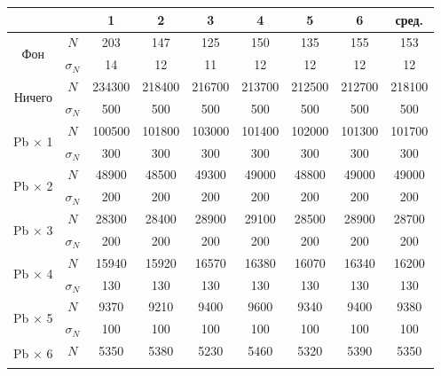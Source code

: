 \documentclass[a4paper,12pt]{article}
\begin{document}
\begin{table}[h!]
\begin{tabular}{|c|c|c|c|c|c|c|c|c|}
\hline
\multicolumn{2}{|c|}{}                      & 1      & 2      & 3      & 4      & 5      & 6      & сред.  \\ \hline
\multirow{2}{*}{Фон}           & $N$        & 203    & 147    & 125    & 150    & 135    & 155    & 153    \\ \cline{2-9} 
                               & $\sigma_N$ & 14     & 12     & 11     & 12     & 12     & 12     & 12     \\ \hline
\multirow{2}{*}{Ничего}        & $N$        & 234300 & 218400 & 216700 & 213700 & 212500 & 212700 & 218100 \\ \cline{2-9} 
                               & $\sigma_N$ & 500    & 500    & 500    & 500    & 500    & 500    & 500    \\ \hline
\multirow{2}{*}{Pb $\times$ 1} & $N$        & 100500 & 101800 & 103000 & 101400 & 102000 & 101300 & 101700 \\ \cline{2-9} 
                               & $\sigma_N$ & 300    & 300    & 300    & 300    & 300    & 300    & 300    \\ \hline
\multirow{2}{*}{Pb $\times$ 2} & $N$        & 48900  & 48500  & 49300  & 49000  & 48800  & 49000  & 49000  \\ \cline{2-9} 
                               & $\sigma_N$ & 200    & 200    & 200    & 200    & 200    & 200    & 200    \\ \hline
\multirow{2}{*}{Pb $\times$ 3} & $N$        & 28300  & 28400  & 28900  & 29100  & 28500  & 28900  & 28700  \\ \cline{2-9} 
                               & $\sigma_N$ & 200    & 200    & 200    & 200    & 200    & 200    & 200    \\ \hline
\multirow{2}{*}{Pb $\times$ 4} & $N$        & 15940  & 15920  & 16570  & 16380  & 16070  & 16340  & 16200  \\ \cline{2-9} 
                               & $\sigma_N$ & 130    & 130    & 130    & 130    & 130    & 130    & 130    \\ \hline
\multirow{2}{*}{Pb $\times$ 5} & $N$        & 9370   & 9210   & 9400   & 9600   & 9340   & 9400   & 9380   \\ \cline{2-9} 
                               & $\sigma_N$ & 100    & 100    & 100    & 100    & 100    & 100    & 100    \\ \hline
\multirow{2}{*}{Pb $\times$ 6} & $N$        & 5350   & 5380   & 5230   & 5460   & 5320   & 5390   & 5350   \\ \cline{2-9} 

\end{tabular}
\end{table}
\end{document}
